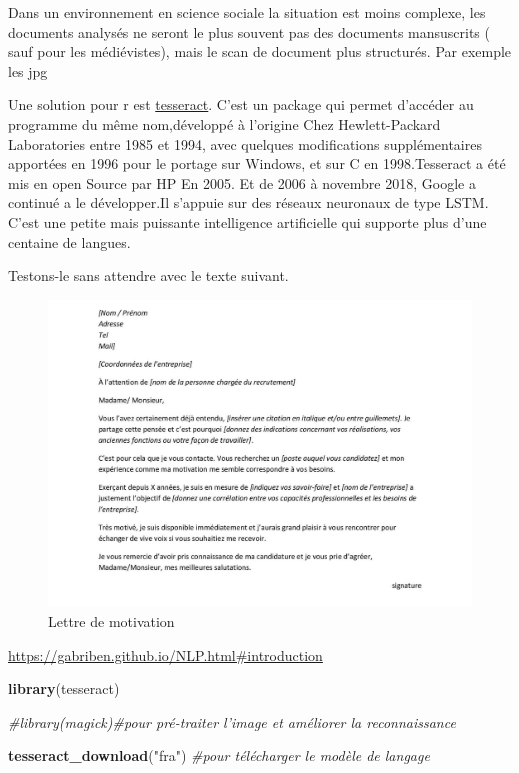 \documentclass[
]{book}
\newenvironment{Shaded}{\begin{snugshade}}{\end{snugshade}}
\newcommand{\CommentTok}[1]{\textcolor[rgb]{0.56,0.35,0.01}{\textit{#1}}}
\newcommand{\KeywordTok}[1]{\textcolor[rgb]{0.13,0.29,0.53}{\textbf{#1}}}
\newcommand{\NormalTok}[1]{#1}
\newcommand{\StringTok}[1]{\textcolor[rgb]{0.31,0.60,0.02}{#1}}
\begin{document}
Dans un environnement en science sociale la situation est moins complexe, les documents analysés ne seront le plus souvent pas des documents mansuscrits ( sauf pour les médiévistes), mais le scan de document plus structurés. Par exemple les jpg

Une solution pour r est \href{https://cran.r-project.org/web/packages/tesseract/vignettes/intro.html}{tesseract}. C'est un package qui permet d'accéder au programme du même nom,développé à l'origine Chez Hewlett-Packard Laboratories entre 1985 et 1994, avec quelques modifications supplémentaires apportées en 1996 pour le portage sur Windows, et sur C en 1998.Tesseract a été mis en open Source par HP En 2005. Et de 2006 à novembre 2018, Google a continué a le développer.Il s'appuie sur des réseaux neuronaux de type LSTM. C'est une petite mais puissante intelligence artificielle qui supporte plus d'une centaine de langues.

Testons-le sans attendre avec le texte suivant.

\begin{figure}
\centering
\includegraphics{./images/LettreMotivation.jpg}
\caption{Lettre de motivation}
\end{figure}

\url{https://gabriben.github.io/NLP.html\#introduction}

\begin{Shaded}
\begin{Highlighting}[]
\KeywordTok{library}\NormalTok{(tesseract)}

\CommentTok{#library(magick)#pour pré-traiter l'image et améliorer la reconnaissance}

\KeywordTok{tesseract_download}\NormalTok{(}\StringTok{"fra"}\NormalTok{) }\CommentTok{#pour télécharger le modèle de langage}
\end{Highlighting}
\end{Shaded}
\end{document}
